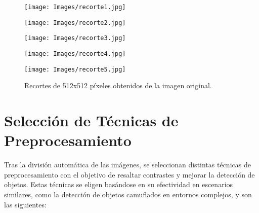 \begin{figure}[ht!]
    \centering
    \begin{minipage}{0.19\textwidth}
        \texttt{[image: Images/recorte1.jpg]}
    \end{minipage}
     \hfill
     \begin{minipage}{0.19\textwidth}
        \texttt{[image: Images/recorte2.jpg]}
     \end{minipage}
    \hfill
     \begin{minipage}{0.19\textwidth}
        \texttt{[image: Images/recorte3.jpg]}
     \end{minipage}
     \hfill
     \begin{minipage}{0.19\textwidth}
         \texttt{[image: Images/recorte4.jpg]}
     \end{minipage}
     \hfill
    \begin{minipage}{0.19\textwidth}
         \texttt{[image: Images/recorte5.jpg]}
     \end{minipage}
     \caption{Recortes de 512x512 píxeles obtenidos de la imagen original.}
     \label{fig:imagen_dividida}
\end{figure}

\section{Selección de Técnicas de Preprocesamiento}
Tras la división automática de las imágenes, se seleccionan distintas técnicas de preprocesamiento con el objetivo de resaltar contrastes y mejorar la detección de objetos.
Estas técnicas se eligen basándose en su efectividad en escenarios similares, como la detección de objetos camuflados en entornos complejos, y son las siguientes:

